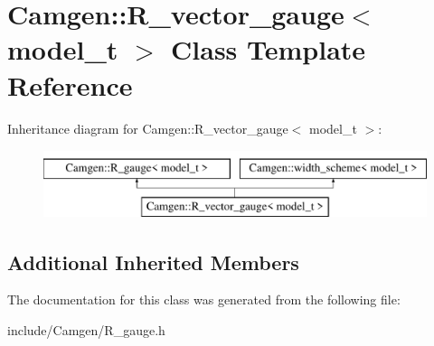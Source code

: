 \hypertarget{a00455}{\section{Camgen\-:\-:R\-\_\-vector\-\_\-gauge$<$ model\-\_\-t $>$ Class Template Reference}
\label{a00455}
}
Inheritance diagram for Camgen\-:\-:R\-\_\-vector\-\_\-gauge$<$ model\-\_\-t $>$\-:\begin{figure}[H]
\begin{center}
\leavevmode
\includegraphics[height=2.000000cm]{a00455}
\end{center}
\end{figure}
\subsection*{Additional Inherited Members}


The documentation for this class was generated from the following file\-:\begin{DoxyCompactItemize}
\item 
include/\-Camgen/R\-\_\-gauge.\-h\end{DoxyCompactItemize}
